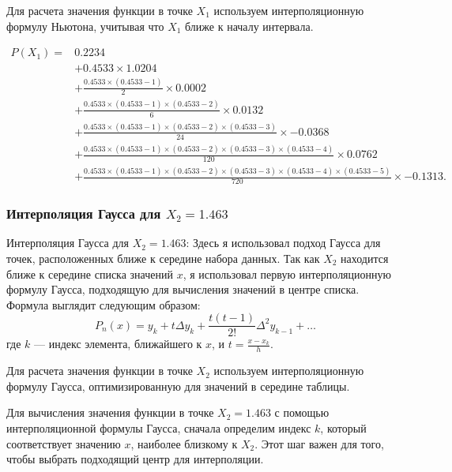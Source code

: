 \documentclass{article}
\begin{document}
                  Для расчета значения функции в точке $X_1$ используем интерполяционную формулу Ньютона, учитывая что $X_1$ ближе к началу интервала.
 
                  \[
                  \begin{aligned}
                  P(X_1) = & 0.2234 \\
                        & + 0.4533 \times 1.0204 \\
                        & + \frac{0.4533 \times (0.4533-1)}{2} \times 0.0002 \\
                        & + \frac{0.4533 \times (0.4533-1) \times (0.4533-2)}{6} \times 0.0132 \\
                        & + \frac{0.4533 \times (0.4533-1) \times (0.4533-2) \times (0.4533-3)}{24} \times -0.0368 \\
                        & + \frac{0.4533 \times (0.4533-1) \times (0.4533-2) \times (0.4533-3) \times (0.4533-4)}{120} \times 0.0762 \\
                        & + \frac{0.4533 \times (0.4533-1) \times (0.4533-2) \times (0.4533-3) \times (0.4533-4) \times (0.4533-5)}{720} \times -0.1313.
                  \end{aligned}
                  \]

            \subsubsection{Интерполяция Гаусса для \( X_2 = 1.463 \)}
            
                  Интерполяция Гаусса для \( X_2 = 1.463 \): Здесь я использовал подход Гаусса для точек, расположенных ближе к середине набора данных. Так как \( X_2 \) находится ближе к середине списка значений \( x \), я использовал первую интерполяционную формулу Гаусса, подходящую для вычисления значений в центре списка. Формула выглядит следующим образом:
                  \[
                  P_n(x) = y_k + t \Delta y_k + \frac{t(t-1)}{2!} \Delta^2 y_{k-1} + \ldots
                  \]
                  где \( k \) — индекс элемента, ближайшего к \( x \), и \( t = \frac{x - x_k}{h} \).

                  Для расчета значения функции в точке \( X_2 \) используем интерполяционную формулу Гаусса, оптимизированную для значений в середине таблицы.

                  Для вычисления значения функции в точке \( X_2 = 1.463 \) с помощью интерполяционной формулы Гаусса, сначала определим индекс \( k \), который соответствует значению \( x \), наиболее близкому к \( X_2 \). Этот шаг важен для того, чтобы выбрать подходящий центр для интерполяции.
\end{document}
